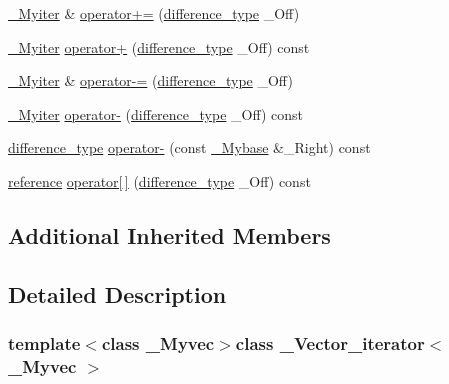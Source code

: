 \begin{DoxyCompactItemize}
\item 
\hyperlink{class___vector__const__iterator_ac41cce1a95dfa665c2d7237fd94d776b}{\+\_\+\+Myiter} \& \hyperlink{class___vector__iterator_a52d3b237e619b02430225a4e8553f5ec}{operator+=} (\hyperlink{class___vector__const__iterator_a4fad8668028c0db06eda92c190eeca39}{difference\+\_\+type} \+\_\+\+Off)
\item 
\hyperlink{class___vector__const__iterator_ac41cce1a95dfa665c2d7237fd94d776b}{\+\_\+\+Myiter} \hyperlink{class___vector__iterator_a3f06cc6f1d241585ab5d4d92e4d6409d}{operator+} (\hyperlink{class___vector__const__iterator_a4fad8668028c0db06eda92c190eeca39}{difference\+\_\+type} \+\_\+\+Off) const 
\item 
\hyperlink{class___vector__const__iterator_ac41cce1a95dfa665c2d7237fd94d776b}{\+\_\+\+Myiter} \& \hyperlink{class___vector__iterator_a5e7ba3c086277ff3750077b61390a6c3}{operator-\/=} (\hyperlink{class___vector__const__iterator_a4fad8668028c0db06eda92c190eeca39}{difference\+\_\+type} \+\_\+\+Off)
\item 
\hyperlink{class___vector__const__iterator_ac41cce1a95dfa665c2d7237fd94d776b}{\+\_\+\+Myiter} \hyperlink{class___vector__iterator_a121e9e2805188ce645a77496559120ab}{operator-\/} (\hyperlink{class___vector__const__iterator_a4fad8668028c0db06eda92c190eeca39}{difference\+\_\+type} \+\_\+\+Off) const 
\item 
\hyperlink{class___vector__const__iterator_a4fad8668028c0db06eda92c190eeca39}{difference\+\_\+type} \hyperlink{class___vector__iterator_a02d060bfcfec3049aa6c149428e721d2}{operator-\/} (const \hyperlink{class___vector__iterator_a62a662bae2cce37b78e1b581c15b2d2f}{\+\_\+\+Mybase} \&\+\_\+\+Right) const 
\item 
\hyperlink{class___vector__const__iterator_ad622d2f855c02a5b3b2f49f39cbbabf4}{reference} \hyperlink{class___vector__iterator_a02a084f0f4608220566f34fe4a0ebf94}{operator\mbox{[}$\,$\mbox{]}} (\hyperlink{class___vector__const__iterator_a4fad8668028c0db06eda92c190eeca39}{difference\+\_\+type} \+\_\+\+Off) const 
\end{DoxyCompactItemize}
\subsection*{Additional Inherited Members}


\subsection{Detailed Description}
\subsubsection*{template$<$class \+\_\+\+Myvec$>$class \+\_\+\+Vector\+\_\+iterator$<$ \+\_\+\+Myvec $>$}



